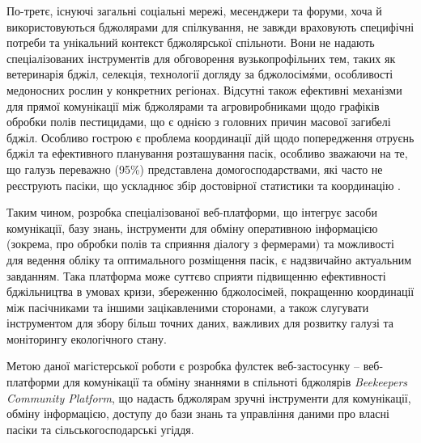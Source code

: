 По-третє, існуючі загальні соціальні мережі, месенджери та форуми, хоча й використовуються бджолярами для спілкування, не завжди враховують специфічні потреби та унікальний контекст бджолярської спільноти. Вони не надають спеціалізованих інструментів для обговорення вузькопрофільних тем, таких як ветеринарія бджіл, селекція, технології догляду за бджолосім\'ями, особливості медоносних рослин у конкретних регіонах. Відсутні також ефективні механізми для прямої комунікації між бджолярами та агровиробниками щодо графіків обробки полів пестицидами, що є однією з головних причин масової загибелі бджіл. Особливо гострою є проблема координації дій щодо попередження отруєнь бджіл та ефективного планування розташування пасік, особливо зважаючи на те, що галузь переважно (95\%) представлена домогосподарствами, які часто не реєструють пасіки, що ускладнює збір достовірної статистики та координацію \cite{skilky2025beeMortality}.

Таким чином, розробка спеціалізованої веб-платформи, що інтегрує засоби комунікації, базу знань, інструменти для обміну оперативною інформацією (зокрема, про обробки полів та сприяння діалогу з фермерами) та можливості для ведення обліку та оптимального розміщення пасік, є надзвичайно актуальним завданням. Така платформа може суттєво сприяти підвищенню ефективності бджільництва в умовах кризи, збереженню бджолосімей, покращенню координації між пасічниками та іншими зацікавленими сторонами, а також слугувати інструментом для збору більш точних даних, важливих для розвитку галузі та моніторингу екологічного стану.

Метою даної магістерської роботи є розробка фулстек веб-застосунку – веб-платформи для комунікації та обміну знаннями в спільноті бджолярів \textit{Beekeepers Community Platform}, що надасть бджолярам зручні інструменти для комунікації, обміну інформацією, доступу до бази знань та управління даними про власні пасіки та сільськогосподарські угіддя.

